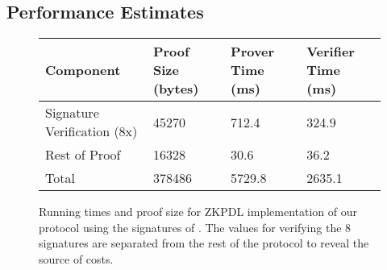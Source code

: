\documentclass[letterpaper,twocolumn,10pt]{article}
\begin{document}
\subsection{Performance Estimates}
\begin{center}
\begin{figure*}
    \begin{tabular}{ | l | l | l | l |}
    \hline
    Component & Proof Size (bytes) & Prover Time (ms) & Verifier Time (ms) \\ \hline
    Signature Verification (8x) & 45270 & 712.4 & 324.9 \\ \hline
    Rest of Proof & 16328 & 30.6 & 36.2 \\ \hline
    Total & 378486 & 5729.8 & 2635.1 \\
    \hline
    \end{tabular}
    \caption{Running times and proof size for ZKPDL implementation of our protocol using the signatures of \cite{CL02}. The values for verifying the 8 signatures are separated from the rest of the protocol to reveal the source of costs.}
\label{ZKP_perf}
\end{figure*}
\end{center}
\end{document}
